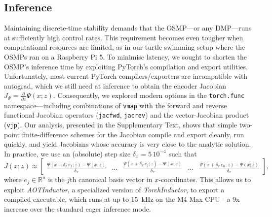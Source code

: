 
\subsection{Inference}
Maintaining discrete-time stability demands that the \gls{OSMP}—or any \gls{DMP}—runs at sufficiently high control rates. This requirement becomes even tougher when computational resources are limited, as in our turtle-swimming setup where the \glspl{OSMP} ran on a Raspberry Pi 5. To minimise latency, we sought to shorten the \gls{OSMP}’s inference time by exploiting PyTorch’s compilation and export utilities. Unfortunately, most current PyTorch compilers/exporters are incompatible with autograd, which we still need at inference to obtain the encoder Jacobian $J_\Psi = \frac{\partial}{\partial x} \Psi(x;z)$. Consequently, we explored modern options in the \texttt{torch.func} namespace—including combinations of \texttt{vmap} with the forward and reverse functional Jacobian operators (\texttt{jacfwd}, \texttt{jacrev}) and the vector-Jacobian product (\texttt{vjp}). Our analysis, presented in the Supplementary Text, shows that simple two-point finite-difference schemes for the Jacobian compile and export cleanly, run quickly, and yield Jacobians whose accuracy is very close to the analytic solution.
In practice, we use an (absolute) step size $\delta_x = 5 \, 10^{-4}$ such that
\begin{equation}
    J(x;z) \approx \begin{bmatrix}
        \frac{\Psi(x+\delta_x \, e_1;z) - \Psi(x;z)}{\delta_x} & \dots &         \frac{\Psi(x+\delta_x \, e_j;z) - \Psi(x;z)}{\delta_x} & \dots & \frac{\Psi(x+\delta_x \, e_n;z) - \Psi(x;z)}{\delta_x}
    \end{bmatrix},
\end{equation}
where $e_j \in \mathbb{R}^n$ is the $j$th canonical basis vector in $x$-coordinates.
This allows us to exploit \emph{AOTInductor}, a specialized version of \emph{TorchInductor}, to export a compiled executable, which runs at up to \SI{15}{kHz} on the M4 Max CPU - a 9x increase over the standard eager inference mode.

